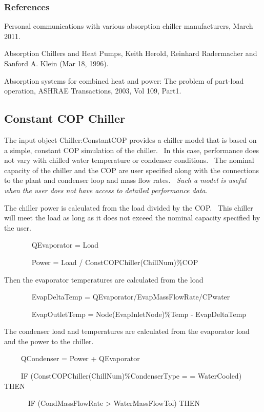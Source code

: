 \subsubsection{References}\label{references-009}

Personal communications with various absorption chiller manufacturers, March 2011.

Absorption Chillers and Heat Pumps, Keith Herold, Reinhard Radermacher and Sanford A. Klein (Mar 18, 1996).

Absorption systems for combined heat and power: The problem of part-load operation, ASHRAE Transactions, 2003, Vol 109, Part1.

\subsection{Constant COP Chiller}\label{constant-cop-chiller}

The input object Chiller:ConstantCOP provides a chiller model that is based on a simple, constant COP simulation of the chiller.~ In this case, performance does not vary with chilled water temperature or condenser conditions.~ The nominal capacity of the chiller and the COP are user specified along with the connections to the plant and condenser loop and mass flow rates.~ \emph{Such a model is useful when the user does not have access to detailed performance data.}

The chiller power is calculated from the load divided by the COP.~ This chiller will meet the load as long as it does not exceed the nominal capacity specified by the user.

~~~~~~~ QEvaporator = Load

~~~~~~~ Power = Load / ConstCOPChiller(ChillNum)\%COP

Then the evaporator temperatures are calculated from the load

~~~~~~~ EvapDeltaTemp = QEvaporator/EvapMassFlowRate/CPwater

~~~~~~~ EvapOutletTemp = Node(EvapInletNode)\%Temp - EvapDeltaTemp

The condenser load and temperatures are calculated from the evaporator load and the power to the chiller.

~~~~ QCondenser = Power + QEvaporator

~~~~ IF (ConstCOPChiller(ChillNum)\%CondenserType = = WaterCooled) THEN

~~~~~~ IF (CondMassFlowRate \textgreater{} WaterMassFlowTol) THEN

